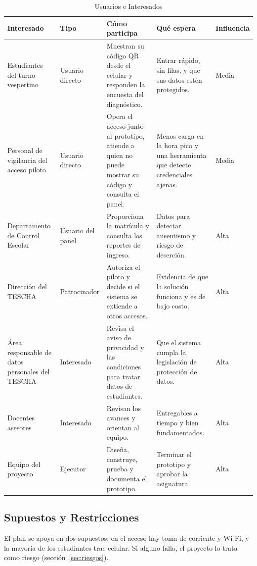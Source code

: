 \begin{table}[tbp]
	\caption{Usuarios e Interesados}
	\label{tab:interesados}
	\small\setlength{\tabcolsep}{3pt}
	\begin{tabular}{P{3.2cm}P{2.3cm}P{4.4cm}P{3.6cm}P{1.5cm}}
		\toprule
		Interesado & Tipo & Cómo participa & Qué espera & Influencia \\
		\midrule
		Estudiantes del turno vespertino & Usuario directo & Muestran su código QR desde el celular y responden la encuesta del diagnóstico. & Entrar rápido, sin filas, y que sus datos estén protegidos. & Media \\
		Personal de vigilancia del acceso piloto & Usuario directo & Opera el acceso junto al prototipo, atiende a quien no puede mostrar su código y consulta el panel. & Menos carga en la hora pico y una herramienta que detecte credenciales ajenas. & Media \\
		Departamento de Control Escolar & Usuario del panel & Proporciona la matrícula y consulta los reportes de ingreso. & Datos para detectar ausentismo y riesgo de deserción. & Alta \\
		Dirección del TESCHA & Patrocinador & Autoriza el piloto y decide si el sistema se extiende a otros accesos. & Evidencia de que la solución funciona y es de bajo costo. & Alta \\
		Área responsable de datos personales del TESCHA & Interesado & Revisa el aviso de privacidad y las condiciones para tratar datos de estudiantes. & Que el sistema cumpla la legislación de protección de datos. & Alta \\
		Docentes asesores & Interesado & Revisan los avances y orientan al equipo. & Entregables a tiempo y bien fundamentados. & Alta \\
		Equipo del proyecto & Ejecutor & Diseña, construye, prueba y documenta el prototipo. & Terminar el prototipo y aprobar la asignatura. & Alta \\
		\bottomrule
	\end{tabular}
\end{table}

\subsection{Supuestos y Restricciones}
El plan se apoya en dos supuestos: en el acceso hay toma de corriente y Wi-Fi,
y la mayoría de los estudiantes trae celular. Si alguno falla, el proyecto lo
trata como riesgo (sección~\ref{sec:riesgos}).

